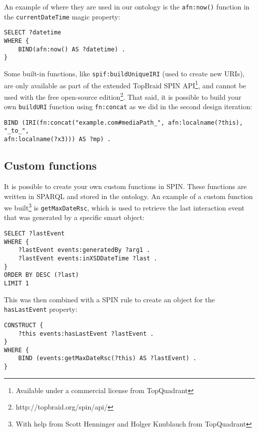 An example of where they are used in our ontology is the \texttt{afn:now()} function in the \texttt{currentDateTime} magic property:

\begin{verbatim}
SELECT ?datetime
WHERE {
	BIND(afn:now() AS ?datetime) .
}
\end{verbatim}

Some built-in functions, like \texttt{spif:buildUniqueIRI} (used to create new URIs), are only available as part of the extended TopBraid SPIN API\footnote{Available under a commercial license from TopQuadrant}, and cannot be used with the free open-source edition\footnote{http://topbraid.org/spin/api/}. That said, it is possible to build your own \texttt{buildURI} function using \texttt{fn:concat} as we did in the second design iteration:

{\footnotesize
\begin{verbatim}
BIND (IRI(fn:concat("example.com#mediaPath_", afn:localname(?this), "_to_",
afn:localname(?x3))) AS ?mp) .	
\end{verbatim}
}

\subsection{Custom functions}

It is possible to create your own custom functions in \ac{SPIN}. These functions are written in \ac{SPARQL} and stored in the ontology. An example of a custom function we built\footnote{With help from Scott Henninger and Holger Knublauch from TopQuadrant} is \texttt{getMaxDateRsc}, which is used to retrieve the last interaction event that was generated by a specific smart object:

\begin{verbatim}
SELECT ?lastEvent
WHERE {
    ?lastEvent events:generatedBy ?arg1 .
    ?lastEvent events:inXSDDateTime ?last .
}
ORDER BY DESC (?last)
LIMIT 1
\end{verbatim}

This was then combined with a \ac{SPIN} rule to create an object for the \texttt{hasLastEvent} property:

\begin{verbatim}
CONSTRUCT {
    ?this events:hasLastEvent ?lastEvent .
}
WHERE {
    BIND (events:getMaxDateRsc(?this) AS ?lastEvent) .
}
\end{verbatim}

